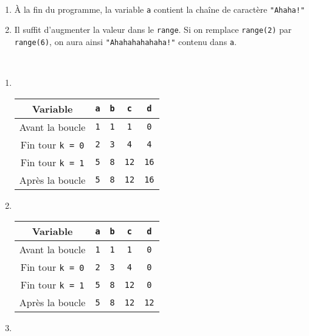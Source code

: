 \begin{correction}~
	\begin{enumerate}
		\item À la fin du programme, la variable \texttt{a} contient la chaîne de caractère \texttt{"Ahaha!"}
		\item Il suffit d'augmenter la valeur dans le \texttt{range}. Si on remplace \texttt{range(2)} par \texttt{range(6)}, on aura ainsi \texttt{"Ahahahahahaha!"} contenu dans \texttt{a}.
	\end{enumerate}
\end{correction}


\begin{correction}~
	\begin{enumerate}
			\item ~
\begin{center}
			\begin{tabular}{|c|c|c|c|c|}
			\hline
			Variable &\texttt{a}&\texttt{b}&\texttt{c}&\texttt{d} \\\hline
			Avant la boucle     &\texttt{1}&\texttt{1}&\texttt{1}&\texttt{0}\\\hline
			Fin tour \texttt{k = 0} &\texttt{2}&\texttt{3}&\texttt{4}&\texttt{4}\\\hline
			Fin tour \texttt{k = 1} &\texttt{5}&\texttt{8}&\texttt{12}&\texttt{16}\\\hline
			Après la boucle     &\texttt{5}&\texttt{8}&\texttt{12}&\texttt{16}\\\hline
		\end{tabular}
\end{center}
	\item ~
		\begin{center}
				\begin{tabular}{|c|c|c|c|c|}
			\hline
			Variable &\texttt{a}&\texttt{b}&\texttt{c}&\texttt{d} \\\hline
			Avant la boucle     &\texttt{1}&\texttt{1}&\texttt{1}&\texttt{0}\\\hline
			Fin tour \texttt{k = 0} &\texttt{2}&\texttt{3}&\texttt{4}&\texttt{0}\\\hline
			Fin tour \texttt{k = 1} &\texttt{5}&\texttt{8}&\texttt{12}&\texttt{0}\\\hline
			Après la boucle     &\texttt{5}&\texttt{8}&\texttt{12}&\texttt{12}\\\hline
		\end{tabular}
		\end{center}
		\item ~\begin{center}

\end{center}
\end{enumerate}
\end{correction}
